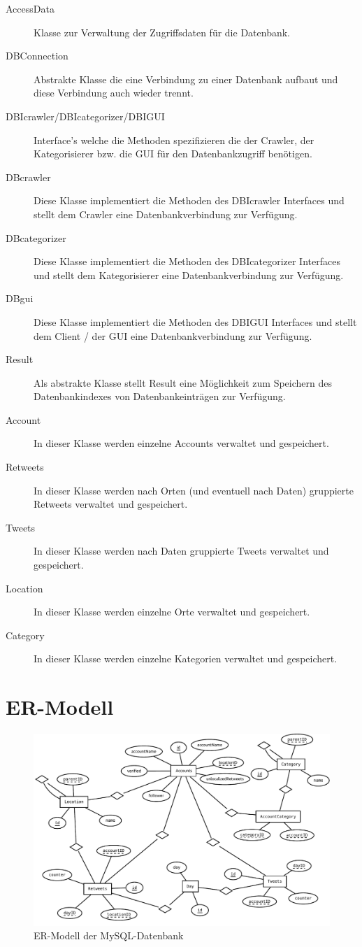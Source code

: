 \begin{description}
\item[AccessData] Klasse zur Verwaltung der Zugriffsdaten für die Datenbank.
\item[DBConnection] Abstrakte Klasse die eine Verbindung zu einer Datenbank aufbaut und diese Verbindung auch wieder trennt.
\item[DBIcrawler/DBIcategorizer/DBIGUI] Interface's welche die Methoden spezifizieren die der Crawler, der Kategorisierer bzw. die GUI für den Datenbankzugriff benötigen.
\item[DBcrawler] Diese Klasse implementiert die Methoden des DBIcrawler Interfaces und stellt dem Crawler eine Datenbankverbindung zur Verfügung.
\item[DBcategorizer] Diese Klasse implementiert die Methoden des DBIcategorizer Interfaces und stellt dem Kategorisierer eine Datenbankverbindung zur Verfügung.
\item[DBgui] Diese Klasse implementiert die Methoden des DBIGUI Interfaces und stellt dem Client / der GUI eine Datenbankverbindung zur Verfügung.
\item[Result] Als abstrakte Klasse stellt Result eine Möglichkeit zum Speichern des Datenbankindexes von Datenbankeinträgen zur Verfügung.
\item[Account] In dieser Klasse werden einzelne Accounts verwaltet und gespeichert.
\item[Retweets] In dieser Klasse werden nach Orten (und eventuell nach Daten) gruppierte Retweets verwaltet und gespeichert.
\item[Tweets] In dieser Klasse werden nach Daten gruppierte Tweets verwaltet und gespeichert.
\item[Location] In dieser Klasse werden einzelne Orte verwaltet und gespeichert.
\item[Category] In dieser Klasse werden einzelne Kategorien verwaltet und gespeichert.
\end{description}

\section{ER-Modell}
\begin{figure}[h!]
	\centering
	\includegraphics[width=\textwidth,height=\textheight, keepaspectratio=true]{dia/er}
	\caption{ER-Modell der MySQL-Datenbank}
	\label{fig:mysql-er}
\end{figure}

